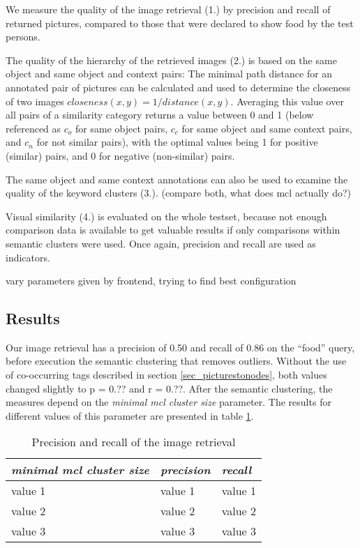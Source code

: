 We measure the quality of the image retrieval (1.) by precision and recall of returned pictures, compared to those that were declared to show food by the test persons.  

The quality of the hierarchy of the retrieved images (2.) is based on the same object and same object and context pairs: The  minimal path distance for an annotated pair of pictures can be calculated and used to determine the closeness of two images $closeness(x,y) = 1/distance(x,y)$. Averaging this value over all pairs of a similarity category returns a value between 0 and 1 (below referenced as $c_o$ for same object pairs, $c_c$ for same object and same context pairs, and $c_n$ for not similar pairs), with the optimal values being 1 for positive (similar) pairs, and 0 for negative (non-similar) pairs.

The same object and same context annotations can also be used to examine the quality of the keyword clusters (3.).  (compare both, what does mcl actually do?)

Visual similarity (4.) is evaluated on the whole testset, because not enough comparison data is available to get valuable results if only comparisons within semantic clusters were used. Once again, precision and recall are used as indicators.

vary parameters given by frontend, trying to find best configuration

\subsection{Results}
\label{sec_results}
Our image retrieval has a precision of 0.50 and recall of 0.86 on the ``food'' query, before execution the semantic clustering that removes outliers. Without the use of co-occurring tags described in section \ref{sec_picturestonodes}, both values changed slightly to p = 0.?? and r = 0.??.
After the semantic clustering, the measures depend on the \emph{minimal mcl cluster size} parameter. The results for different values of this parameter are presented in table \ref{tab_retrievalevaluation}.\\

\begin{table}[h]
    \begin{tabular}{| p{4.5cm} || p{1.5cm} | p{1.5cm} |}
    \hline
    \emph{minimal mcl cluster size} & \emph{precision} & \emph{recall} \\ \hline
    value 1 		& value 1 	& value 1 \\ \hline
    value 2 		& value 2 	& value 2 \\ \hline
    value 3	 	& value 3 	& value 3 \\
    \hline
    \end{tabular}
    \caption{Precision and recall of the image retrieval}
	\label{tab_retrievalevaluation}
\end{table}


